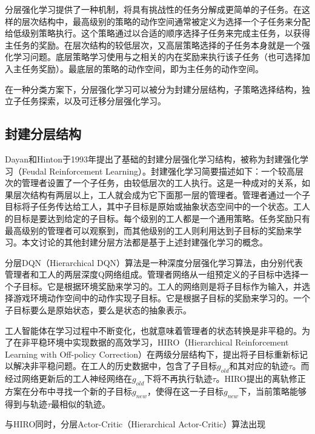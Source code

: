 分层强化学习提供了一种机制，将具有挑战性的任务分解成更简单的子任务。在这样的层次结构中，最高级别的策略的动作空间通常被定义为选择一个子任务来分配给低级别策略执行。这个策略通过以合适的顺序选择子任务来完成主任务，以获得主任务的奖励。在层次结构的较低层次，又高层策略选择的子任务本身就是一个强化学习问题。底层策略学习使用与之相关的内在奖励来执行该子任务（也可选择加入主任务奖励）。最底层的策略的动作空间，即为主任务的动作空间。

在一种分类方案下，分层强化学习可以被分为封建分层结构，子策略选择结构，独立子任务探索，以及可迁移分层强化学习。

\subsection{封建分层结构}

Dayan和Hinton于1993年提出了基础的封建分层强化学习结构\cite{NIPS1992_d14220ee}，被称为封建强化学习（Feudal Reinforcement Learning）。封建强化学习简要描述如下：一个较高层次的管理者设置了一个子任务，由较低层次的工人执行。这是一种成对的关系，如果层次结构有两层以上，工人就会成为它下面那一层的管理者。管理者通过一个子目标将子任务传达给工人，其中子目标是原始或抽象状态空间中的一个状态。工人的目标是要达到给定的子目标。每个级别的工人都是一个通用策略。任务奖励只有最高级别的管理者可以观察到，而其他级别的工人则利用达到子目标的奖励来学习。本文讨论的其他封建分层方法都是基于上述封建强化学习的概念。

分层DQN（Hierarchical DQN）\cite{kulkarni2016hierarchical}算法是一种深度分层强化学习算法，由分别代表管理者和工人的两层深度Q网络组成。管理者网络从一组预定义的子目标中选择一个子目标。它是根据环境奖励来学习的。工人的网络则是将子目标作为输入，并选择游戏环境动作空间中的动作实现子目标。它是根据子目标的奖励来学习的。一个子目标要么是原始状态，要么是状态的抽象表示。

工人智能体在学习过程中不断变化，也就意味着管理者的状态转换是非平稳的。为了在非平稳环境中实现数据的高效学习，HIRO（Hierarchical Reinforcement Learning with Off-policy Correction）在两级分层结构下，提出将子目标重新标记以解决非平稳问题。在工人的历史数据中，包含了子目标$g_{old}$和其对应的轨迹$\tau$。而经过网络更新后的工人神经网络在$g_{old}$下将不再执行轨迹$\tau$。HIRO提出的离轨修正方案在分布中寻找一个新的子目标$g_{new}$，使得在这一子目标$g_{new}$下，当前策略能够得到与轨迹$\tau$最相似的轨迹。

与HIRO同时，分层Actor-Critic（Hierarchical Actor-Critic）\cite{levy2017learning}算法出现

